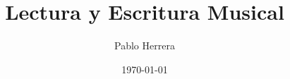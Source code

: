 \documentclass[a4paper,11pt]{scrbook}
\title{Lectura y Escritura Musical}
\author{Pablo Herrera}
\date{\today}
\begin{document}
\renewcommand\figurename{Ejemplo}
\renewcommand\thefigure{\arabic{figure}}
\maketitle
\frontmatter
\tableofcontents
\mainmatter







%


\backmatter
\end{document}
